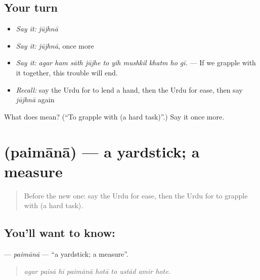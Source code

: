 \subsection*{Your turn}
\begin{itemize}
\raggedright
  \item \emph{Say it:} \emph{jūjhnā}
  \item \emph{Say it:} \emph{jūjhnā}, once more
  \item \emph{Say it:} \emph{agar ham sāth jūjhe to yih mushkil khatm ho gī.} — If we grapple with it together, this trouble will end.
  \item \emph{Recall:} say the Urdu for to lend a hand, then the Urdu for ease, then say \emph{jūjhnā} again
\end{itemize}

\begin{tcolorbox}[breakable,colback=teal!4,colframe=teal!35!black,title={Before you move on}]
What does  mean? (\textquotedblleft{}To grapple with (a hard task)\textquotedblright{}.) Say it once more.
\end{tcolorbox}
\section[\texorpdfstring{\ur{پیمانہ} (paimānā)}{پیمانہ (paimānā)}]{ (paimānā) — a yardstick; a measure}

\label{lesson:UR-C546-paimana}



\begin{quote}
Before the new one: say the Urdu for ease, then the Urdu for to grapple with (a hard task).
\end{quote}

\subsection*{You'll want to know: }
\textbf{} — \emph{paimānā} — \textquotedblleft{}a yardstick; a measure\textquotedblright{}.

\begin{quote}
        
\end{quote}

\begin{quote}
\emph{agar paisā hī paimānā hotā to ustād amīr hote.}
\end{quote}

